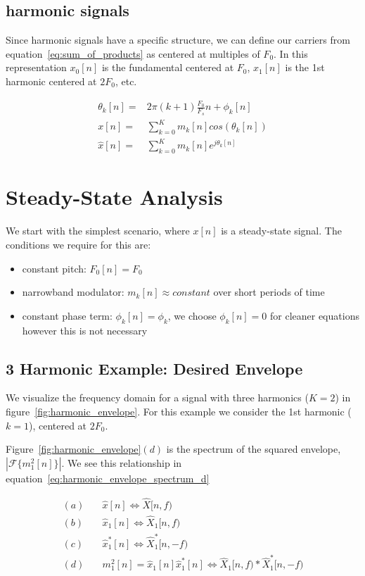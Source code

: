 \documentclass [11pt, proquest] {uwthesis}[2015/03/03]
\begin{document}
\subsection{harmonic signals}

Since harmonic signals have a specific structure, we can define our carriers from equation~\ref{eq:sum_of_products} as centered at multiples of $F_0$. In this representation $x_0[n]$ is the fundamental centered at $F_0$, $x_1[n]$ is the 1st harmonic centered at $2F_0$, etc.

\begin{align}
\theta_k[n] =& 2\pi(k+1)\frac{F_0}{F_s}n + \phi_k[n] \\
x[n] =& \sum\limits_{k=0}^K m_k[n] cos(\theta_k[n]) \\
\widehat{x}[n] =& \sum\limits_{k=0}^K m_k[n] e^{j\theta_k[n]}
\end{align}


\section{Steady-State Analysis}

We start with the simplest scenario, where $x[n]$ is a steady-state signal.  The conditions we require for this are:

\begin{itemize}
\item constant pitch: $F_0[n] = F_0$
\item narrowband modulator: $m_k[n] \approx constant$ over short periods of time
\item constant phase term: $\phi_k[n] = \phi_k$, we choose $\phi_k[n] = 0$ for cleaner equations however this is not necessary
\end{itemize}

\subsection{3 Harmonic Example: Desired Envelope}

We visualize the frequency domain for a signal with three harmonics ($K = 2$) in figure~\ref{fig:harmonic_envelope}.  For this example we consider the 1st harmonic ($k = 1$), centered at $2F_0$.

Figure~\ref{fig:harmonic_envelope}$(d)$ is the spectrum of the squared envelope, $| \mathcal{F} \{m_1^2[n] \}|$.  We see this relationship in equation~\ref{eq:harmonic_envelope_spectrum_d}

\begin{align}
\label{eq:harmonic_envelope_spectrum_a}
(a)& \quad \widehat{x}[n] \Longleftrightarrow \widehat{X}[n,f)  \\
(b)& \quad \widehat{x}_1[n] \Longleftrightarrow \widehat{X}_1[n,f) \\
(c)& \quad \widehat{x}_1^*[n] \Longleftrightarrow \widehat{X}_1^*[n,-f) \\
\label{eq:harmonic_envelope_spectrum_d}
(d)& \quad m_1^2[n] = \widehat{x}_1[n] \widehat{x}_1^*[n] \Longleftrightarrow \widehat{X}_1[n,f) * \widehat{X}_1^*[n,-f)
\end{align}
\end{document}
